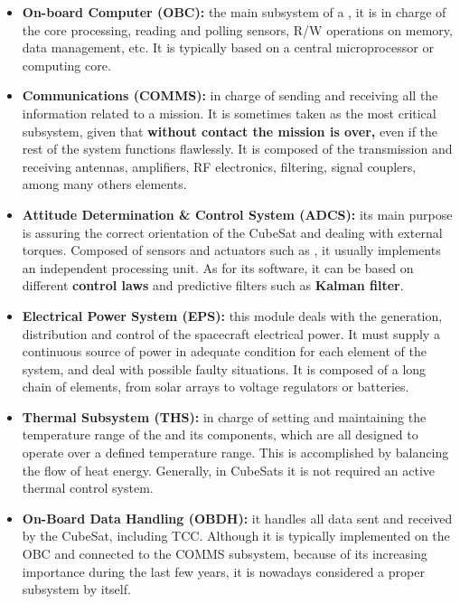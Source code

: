 \begin{itemize} [noitemsep]

	\item \textbf{On-board Computer (\acrshort{OBC}):} the main subsystem of a , it is in charge of the core processing, reading and polling sensors, R/W operations on memory, data management, etc. It is typically based on a central microprocessor or computing core. \\

	\item \textbf{Communications (\acrshort{COMMS}):} in charge of sending and receiving all the information related to a mission. It is sometimes taken as the most critical subsystem, given that \textbf{without contact the mission is over,} even if the rest of the system functions flawlessly. It is composed of the transmission and receiving antennas, amplifiers, \acrshort{RF} electronics, filtering, signal couplers, among many others elements. \\

	\item \textbf{Attitude Determination \& Control System (\acrshort{ADCS}):} its main purpose is assuring the correct orientation of the CubeSat and dealing with external torques. Composed of sensors and actuators such as , it usually implements an independent processing unit. As for its software, it can be based on different \textbf{control laws} and predictive filters such as \textbf{Kalman filter}.\\

	\item \textbf{Electrical Power System (\acrshort{EPS}):} this module deals with the generation, distribution and control of the spacecraft electrical power. It must supply a continuous source of power in adequate condition for each element of the system, and deal with possible faulty situations. It is composed of a long chain of elements, from solar arrays to voltage regulators or batteries.\\

	\item \textbf{Thermal Subsystem (\acrshort{THS}):} in charge of setting and maintaining the temperature range of the  and its components, which are all designed to operate over a defined temperature range. This is accomplished by balancing the flow of heat energy. Generally, in CubeSats it is not required an active thermal control system.\\

		\item \textbf{On-Board Data Handling (\acrshort{OBDH}):} it handles all data sent and received by the CubeSat, including \acrshort{TCC}. Although it is typically implemented on the \acrshort{OBC} and connected to the \acrshort{COMMS} subsystem, because of its increasing importance during the last few years, it is nowadays considered a proper subsystem by itself.

\end{itemize}

